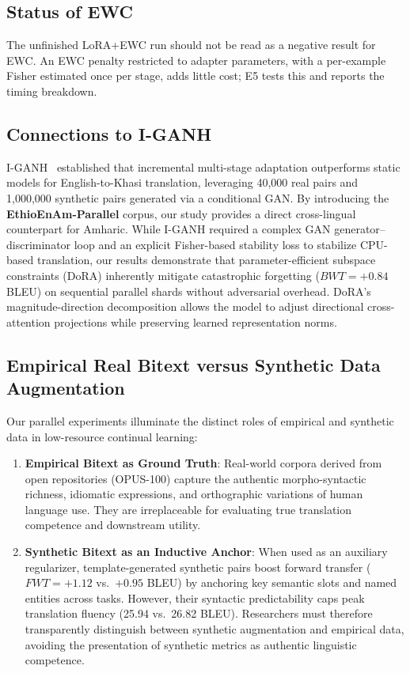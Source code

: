 \documentclass[11pt,a4paper]{article}
\begin{document}
\subsection{Status of EWC}

The unfinished LoRA+EWC run should not be read as a negative result
for EWC.  An EWC penalty restricted to adapter parameters, with a
per-example Fisher estimated once per stage, adds little cost; E5
tests this and reports the timing breakdown.

\subsection{Connections to I-GANH}

I-GANH~\cite{Syiemlieh2026} established that incremental multi-stage
adaptation outperforms static models for English-to-Khasi translation,
leveraging 40,000 real pairs and 1,000,000 synthetic pairs generated via
a conditional GAN.  By introducing the \textbf{EthioEnAm-Parallel}
corpus, our study provides a direct cross-lingual counterpart for Amharic.
While I-GANH required a complex GAN generator--discriminator loop and
an explicit Fisher-based stability loss to stabilize CPU-based translation,
our results demonstrate that parameter-efficient subspace constraints
(DoRA) inherently mitigate catastrophic forgetting ($BWT = +0.84$ BLEU)
on sequential parallel shards without adversarial overhead.  DoRA's
magnitude-direction decomposition allows the model to adjust directional
cross-attention projections while preserving learned representation norms.

\subsection{Empirical Real Bitext versus Synthetic Data Augmentation}

Our parallel experiments illuminate the distinct roles of empirical and
synthetic data in low-resource continual learning:
\begin{enumerate}
  \item \textbf{Empirical Bitext as Ground Truth}: Real-world corpora
        derived from open repositories (OPUS-100) capture the authentic
        morpho-syntactic richness, idiomatic expressions, and orthographic
        variations of human language use.  They are irreplaceable for
        evaluating true translation competence and downstream utility.
  \item \textbf{Synthetic Bitext as an Inductive Anchor}: When used as an
        auxiliary regularizer, template-generated synthetic pairs boost
        forward transfer ($FWT = +1.12$ vs.\ $+0.95$ BLEU) by anchoring
        key semantic slots and named entities across tasks.  However, their
        syntactic predictability caps peak translation fluency (25.94 vs.\
        26.82 BLEU).  Researchers must therefore transparently distinguish
        between synthetic augmentation and empirical data, avoiding the
        presentation of synthetic metrics as authentic linguistic competence.
\end{enumerate}
\end{document}
